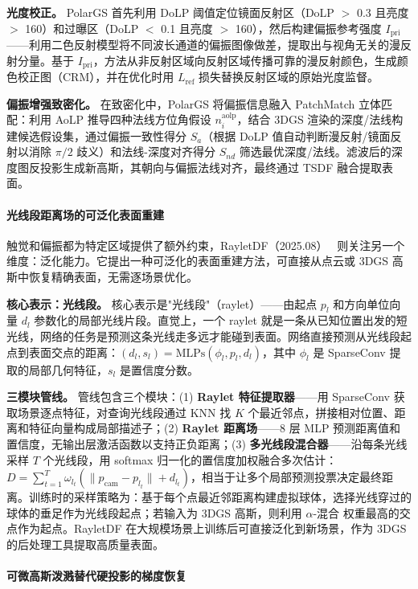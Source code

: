 \textbf{光度校正。} PolarGS 首先利用 DoLP 阈值定位镜面反射区（DoLP $>$ 0.3 且亮度 $>$ 160）和过曝区（DoLP $<$ 0.1 且亮度 $>$ 160），然后构建偏振参考强度 $I_{\text{pri}}$——利用二色反射模型将不同波长通道的偏振图像做差，提取出与视角无关的漫反射分量。基于 $I_{\text{pri}}$，方法从非反射区域向反射区域传播可靠的漫反射颜色，生成颜色校正图（CRM），并在优化时用 $L_{\text{ref}}$ 损失替换反射区域的原始光度监督。

\textbf{偏振增强致密化。} 在致密化中，PolarGS 将偏振信息融入 PatchMatch 立体匹配：利用 AoLP 推导四种法线方位角假设 $n^{\text{aolp}}_i$，结合 3DGS 渲染的深度/法线构建候选假设集，通过偏振一致性得分 $S_a$（根据 DoLP 值自动判断漫反射/镜面反射以消除 $\pi/2$ 歧义）和法线-深度对齐得分 $S_{nd}$ 筛选最优深度/法线。滤波后的深度图反投影生成新高斯，其朝向与偏振法线对齐，最终通过 TSDF 融合提取表面。

\paragraph{光线段距离场的可泛化表面重建}

触觉和偏振都为特定区域提供了额外约束，RayletDF（2025.08）~\cite{2508_09830} 则关注另一个维度：泛化能力。它提出一种可泛化的表面重建方法，可直接从点云或 3DGS 高斯中恢复精确表面，无需逐场景优化。

\textbf{核心表示：光线段。} 核心表示是"光线段"（raylet）——由起点 $p_l$ 和方向单位向量 $d_l$ 参数化的局部光线片段。直觉上，一个 raylet 就是一条从已知位置出发的短光线，网络的任务是预测这条光线走多远才能碰到表面。网络直接预测从光线段起点到表面交点的距离：$(d_l, s_l) = \text{MLPs}(\phi_l, p_l, d_l)$，其中 $\phi_l$ 是 SparseConv 提取的局部几何特征，$s_l$ 是置信度分数。

\textbf{三模块管线。} 管线包含三个模块：(1) \textbf{Raylet 特征提取器}——用 SparseConv 获取场景逐点特征，对查询光线段通过 KNN 找 $K$ 个最近邻点，拼接相对位置、距离和特征向量构成局部描述子；(2) \textbf{Raylet 距离场}——8 层 MLP 预测距离值和置信度，无输出层激活函数以支持正负距离；(3) \textbf{多光线段混合器}——沿每条光线采样 $T$ 个光线段，用 softmax 归一化的置信度加权融合多次估计：$D = \sum_{t=1}^{T}\omega_{l_t}(\|p_{\text{cam}} - p_{l_t}\| + d_{l_t})$，相当于让多个局部预测投票决定最终距离。训练时的采样策略为：基于每个点最近邻距离构建虚拟球体，选择光线穿过的球体的垂足作为光线段起点；若输入为 3DGS 高斯，则利用 $\alpha$-混合 权重最高的交点作为起点。RayletDF 在大规模场景上训练后可直接泛化到新场景，作为 3DGS 的后处理工具提取高质量表面。

\paragraph{可微高斯泼溅替代硬投影的梯度恢复}

